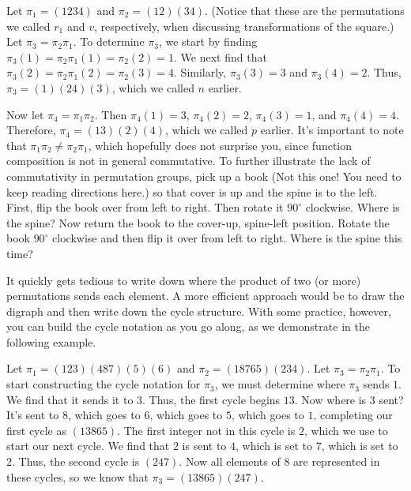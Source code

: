 \begin{example}
  Let $\pi_1 = (1234)$ and $\pi_2 = (12)(34)$. (Notice that these are
  the permutations we called $r_1$ and $v$, respectively, when
  discussing transformations of the square.) Let
  $\pi_3=\pi_2\pi_1$. To determine $\pi_3$, we start by finding
  $\pi_3(1) = \pi_2\pi_1(1) = \pi_2(2) = 1$. We next find that
  $\pi_3(2) = \pi_2\pi_1(2) = \pi_2(3)=4$. Similarly, $\pi_3(3) = 3$
  and $\pi_3(4)=2$. Thus, $\pi_3=(1)(24)(3)$, which we called $n$
  earlier.

  Now let $\pi_4 = \pi_1\pi_2$. Then $\pi_4(1) = 3$, $\pi_4(2)=2$,
  $\pi_4(3)=1$, and $\pi_4(4)=4$. Therefore, $\pi_4=(13)(2)(4)$, which
  we called $p$ earlier. It's important to note that $\pi_1\pi_2\neq
  \pi_2\pi_1$, which hopefully does not surprise you, since function
  composition is not in general commutative. To further illustrate the
  lack of commutativity in permutation groups, pick up a book (Not
  this one! You need to keep reading directions here.) so that
  cover is up and the spine is to the left. First, flip the book over
  from left to right. Then rotate it $90^\circ$
  clockwise. Where is the spine? Now return the book to the cover-up,
  spine-left position. Rotate the book $90^\circ$ clockwise and then
  flip it over from left to right. Where is the spine this time?
  \end{example}

It quickly gets tedious to write down where the product of two (or
more) permutations sends each element. A more efficient approach would
be to draw the digraph and then write down the cycle structure. With
some practice, however, you can build the cycle notation as you go
along, as we demonstrate in the following example.

\begin{example}
  Let $\pi_1=(123)(487)(5)(6)$ and $\pi_2=(18765)(234)$. Let $\pi_3 =
  \pi_2\pi_1$. To start constructing the cycle notation for $\pi_3$,
  we must determine where $\pi_3$ sends $1$. We find that it sends it
  to $3$. Thus, the first cycle begins $13$. Now where is $3$ sent?
  It's sent to $8$, which goes to $6$, which goes to $5$, which goes
  to $1$, completing our first cycle as $(13865)$. The first integer
  not in this cycle is $2$, which we use to start our next cycle. We
  find that $2$ is sent to $4$, which is set to $7$, which is set to
  $2$. Thus, the second cycle is $(247)$. Now all elements of $8$ are
  represented in these cycles, so we know that $\pi_3 =
  (13865)(247)$.
\end{example}

